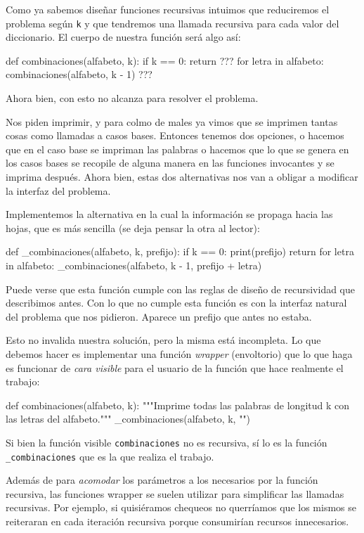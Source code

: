 Como ya sabemos diseñar funciones recursivas intuimos que reduciremos el
problema según \lstinline!k! y que tendremos una llamada recursiva para cada
valor del diccionario. El cuerpo de nuestra función será algo así:
\begin{codigo-python-sn}
def combinaciones(alfabeto, k):
    if k == 0:
        return ???
    for letra in alfabeto:
        combinaciones(alfabeto, k - 1) ???
\end{codigo-python-sn}
Ahora bien, con esto no alcanza para resolver el problema.

Nos piden imprimir, y para colmo de males ya vimos que se imprimen tantas cosas
como llamadas a casos bases. Entonces tenemos dos opciones, o hacemos que en el
caso base se impriman las palabras o hacemos que lo que se genera en los casos
bases se recopile de alguna manera en las funciones invocantes y se imprima
después. Ahora bien, estas dos
alternativas nos van a obligar a modificar la interfaz del problema.

Implementemos la alternativa en la cual la información se propaga hacia las
hojas, que es más sencilla (se deja pensar la otra al lector):
\begin{codigo-python-sn}
def _combinaciones(alfabeto, k, prefijo):
    if k == 0:
        print(prefijo)
        return
    for letra in alfabeto:
        _combinaciones(alfabeto, k - 1, prefijo + letra)
\end{codigo-python-sn}
Puede verse que esta función cumple con las reglas de diseño de recursividad
que describimos antes. Con lo que no cumple esta función es con la interfaz
natural del problema que nos pidieron. Aparece un prefijo que antes no estaba.

Esto no invalida nuestra solución, pero la misma está incompleta. Lo que
debemos hacer es implementar una función \emph{wrapper} (envoltorio) que lo
que haga es funcionar de \emph{cara visible} para el usuario de la función que
hace realmente el trabajo:
\begin{codigo-python-sn}
def combinaciones(alfabeto, k):
   """Imprime todas las palabras de longitud k con las letras del alfabeto."""
   _combinaciones(alfabeto, k, "")
\end{codigo-python-sn}
Si bien la función visible \lstinline!combinaciones! no es recursiva, sí lo
es la función \lstinline!_combinaciones! que es la que realiza el trabajo.

Además de para \emph{acomodar} los parámetros a los necesarios por la función
recursiva, las funciones wrapper se suelen utilizar para
simplificar las llamadas recursivas. Por ejemplo, si quisiéramos chequeos no
querríamos que los mismos se reiteraran en cada iteración recursiva porque
consumirían recursos innecesarios.

